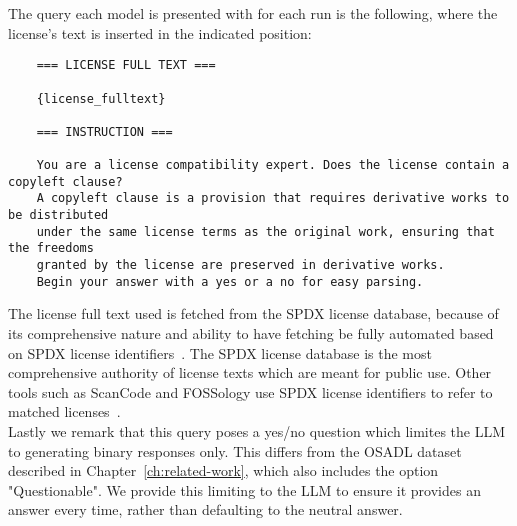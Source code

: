 The query each model is presented with for each run is the following, where the license's text is inserted in the indicated position:

\begin{verbatim}
	=== LICENSE FULL TEXT ===
	
	{license_fulltext}
	
	=== INSTRUCTION ===
	
	You are a license compatibility expert. Does the license contain a copyleft clause?
	A copyleft clause is a provision that requires derivative works to be distributed
	under the same license terms as the original work, ensuring that the freedoms
	granted by the license are preserved in derivative works.
	Begin your answer with a yes or a no for easy parsing.
\end{verbatim}

The license full text used is fetched from the SPDX license database, because of its comprehensive nature and ability to have fetching be fully automated based on SPDX license identifiers~\cite{spdx-licenses}. The SPDX license database is the most comprehensive authority of license texts which are meant for public use. Other tools such as ScanCode and FOSSology use SPDX license identifiers to refer to matched licenses~\cite{scancode-home}\cite{fossology-home}. \\

Lastly we remark that this query poses a yes/no question which limites the LLM to generating binary responses only. This differs from the OSADL dataset described in Chapter~\ref{ch:related-work}, which also includes the option "Questionable". We provide this limiting to the LLM to ensure it provides an answer every time, rather than defaulting to the neutral answer.